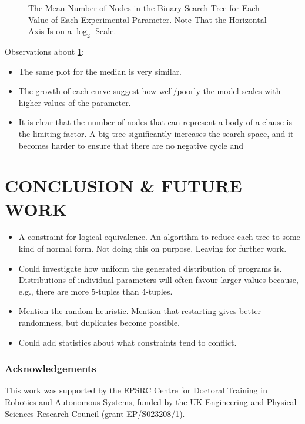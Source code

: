 \documentclass[letterpaper]{article}
\theoremstyle{definition}
\begin{document}
\begin{figure}[t]
  \centering
  
  \caption{The Mean Number of Nodes in the Binary Search Tree for Each Value of
    Each Experimental Parameter. Note That the Horizontal Axis Is on a $\log_2$
    Scale.}
  \label{fig:impact}
\end{figure}

Observations about \cref{fig:impact}:
\begin{itemize}
\item The same plot for the median is very similar.
\item The growth of each curve suggest how well/poorly the model scales with
  higher values of the parameter.
\item It is clear that the number of nodes that can represent a body of a clause
  is the limiting factor. A big tree significantly increases the search space,
  and it becomes harder to ensure that there are no negative cycle and 
\end{itemize}

\section{CONCLUSION \& FUTURE WORK}

\begin{itemize}
\item A constraint for logical equivalence. An algorithm to reduce each tree to
  some kind of normal form. Not doing this on purpose. Leaving for further work.
\item Could investigate how uniform the generated distribution of programs is.
  Distributions of individual parameters will often favour larger values
  because, e.g., there are more 5-tuples than 4-tuples.
\item Mention the random heuristic. Mention that restarting gives better
  randomness, but duplicates become possible.
\item Could add statistics about what constraints tend to conflict.
\end{itemize}

\subsubsection*{Acknowledgements}

This work was supported by the EPSRC Centre for Doctoral Training in Robotics
and Autonomous Systems, funded by the UK Engineering and Physical Sciences
Research Council (grant EP/S023208/1).

\renewcommand{\bibsection}{\subsubsection*{References}}

\end{document}
